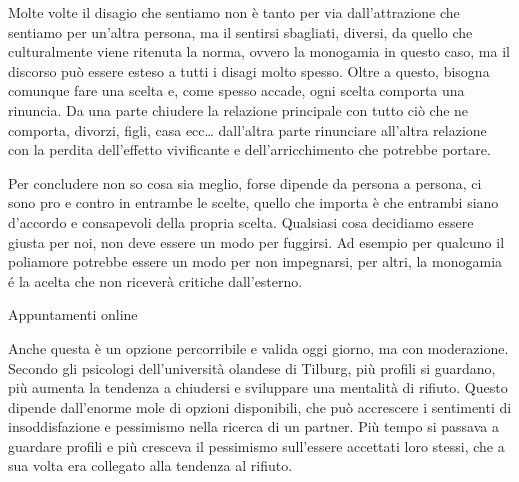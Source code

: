 \documentclass[12pt]{book} %
\begin{document}
Molte volte il disagio che sentiamo non è tanto per via dall'attrazione che sentiamo per
un'altra persona, ma il sentirsi sbagliati, diversi, da quello che culturalmente viene ritenuta la
norma, ovvero la monogamia in questo caso, ma il discorso può essere esteso a tutti i disagi molto spesso. Oltre a
questo, bisogna comunque fare una scelta e, come spesso accade, ogni scelta comporta una rinuncia. Da una parte
chiudere la relazione principale con tutto ciò che ne comporta, divorzi, figli, casa ecc…
dall'altra parte rinunciare all'altra relazione con la perdita
dell'effetto vivificante e dell'arricchimento che potrebbe portare. 

Per concludere non so cosa sia meglio, forse dipende da persona a persona, ci sono pro e contro in entrambe le scelte,
quello che importa è che entrambi siano d'accordo e consapevoli della propria scelta. Qualsiasi
cosa decidiamo essere giusta per noi, non deve essere un modo per fuggirsi. Ad esempio per qualcuno il poliamore
potrebbe essere un modo per non impegnarsi, per altri, la monogamia é la acelta che non riceverà critiche dall'esterno.

\begin{mdframed}[linewidth=1pt]
Appuntamenti online

Anche questa è un opzione percorribile e valida oggi giorno, ma con moderazione. Secondo gli psicologi dell'università
olandese di Tilburg, più profili si guardano, più aumenta la tendenza a chiudersi e sviluppare una mentalità di
rifiuto. Questo dipende dall'enorme mole di opzioni disponibili, che può accrescere i sentimenti
di insoddisfazione e pessimismo nella ricerca di un partner. Più tempo si passava a guardare profili e più cresceva il
pessimismo sull'essere accettati loro stessi, che a sua volta era collegato alla tendenza al rifiuto.
\end{mdframed}
\end{document}
